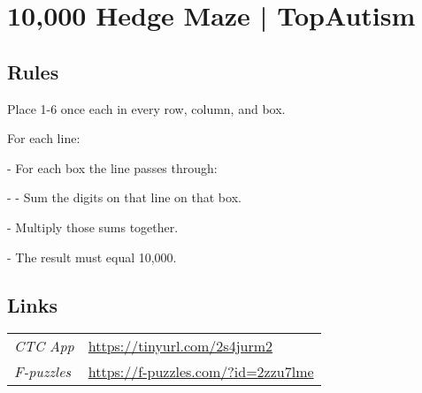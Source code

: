 \section{10,000 Hedge Maze | {\normalfont TopAutism}}
\label{sec:52-10000-hedge-maze-topautism}

\subsection*{Rules}
\begin{markdown}
Place 1-6 once each in every row, column, and box.

For each line:

- For each box the line passes through:

- - Sum the digits on that line on that box.

- Multiply those sums together.

- The result must equal 10,000.
\end{markdown}
\subsection*{Links}
\begin{tabularx}{\textwidth}{l X}
\emph{CTC App} & \url{https://tinyurl.com/2s4jurm2} \\
\emph{F-puzzles} & \url{https://f-puzzles.com/?id=2zzu7lme} \\
\end{tabularx}
\pagebreak
